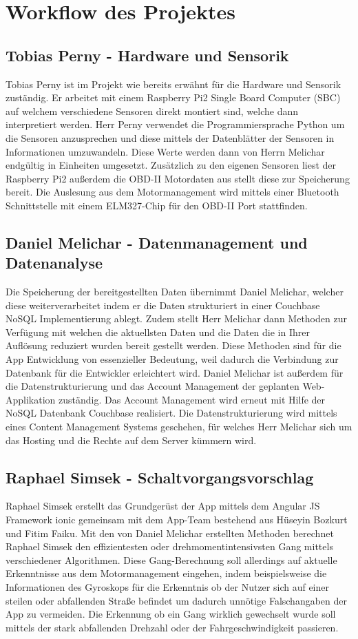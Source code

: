 \newline
\section{Workflow des Projektes}
	\subsection{Tobias Perny - Hardware und Sensorik}
	Tobias Perny ist im Projekt wie bereits erwähnt für die Hardware und Sensorik zuständig. Er arbeitet mit einem Raspberry Pi2 Single Board Computer (SBC) auf welchem verschiedene Sensoren direkt montiert sind, welche dann interpretiert werden. Herr Perny verwendet die Programmiersprache Python um die Sensoren anzusprechen und diese mittels der Datenblätter der Sensoren in Informationen umzuwandeln. Diese Werte werden dann von Herrn Melichar endgültig in Einheiten umgesetzt.
	Zusätzlich zu den eigenen Sensoren liest der Raspberry Pi2 außerdem die OBD-II Motordaten aus stellt diese zur Speicherung bereit. 
	Die Auslesung aus dem Motormanagement wird mittels einer Bluetooth Schnittstelle mit einem ELM327-Chip für den OBD-II Port stattfinden.

	\subsection{Daniel Melichar - Datenmanagement und Datenanalyse}
	Die Speicherung der bereitgestellten Daten übernimmt Daniel Melichar, welcher diese weiterverarbeitet indem er die Daten strukturiert in einer Couchbase NoSQL Implementierung ablegt. Zudem stellt Herr Melichar dann Methoden zur Verfügung mit welchen die aktuellsten Daten und die Daten die in Ihrer Auflösung reduziert wurden bereit gestellt werden. Diese Methoden sind für die App Entwicklung von essenzieller Bedeutung, weil dadurch die Verbindung zur Datenbank für die Entwickler erleichtert wird.
	Daniel Melichar ist außerdem für die Datenstrukturierung und das Account Management der geplanten Web-Applikation zuständig. Das Account Management wird erneut mit Hilfe der NoSQL Datenbank Couchbase realisiert. Die Datenstrukturierung wird mittels eines Content Management Systems geschehen, für welches Herr Melichar sich um das Hosting und die Rechte auf dem Server kümmern wird. 

	\subsection{Raphael Simsek - Schaltvorgangsvorschlag}
	Raphael Simsek erstellt das Grundgerüst der App mittels dem Angular JS Framework ionic gemeinsam mit dem App-Team bestehend aus Hüseyin Bozkurt und Fitim Faiku.
	Mit den von Daniel Melichar erstellten Methoden berechnet Raphael Simsek den effizientesten oder drehmomentintensivsten Gang mittels verschiedener Algorithmen. Diese Gang-Berechnung soll allerdings auf aktuelle Erkenntnisse aus dem Motormanagement eingehen, indem beispielsweise die Informationen des Gyroskops für die Erkenntnis ob der Nutzer sich auf einer steilen oder abfallenden Straße befindet um dadurch unnötige Falschangaben der App zu vermeiden. Die Erkennung ob ein Gang wirklich gewechselt wurde soll mittels der stark abfallenden Drehzahl oder der Fahrgeschwindigkeit passieren.
